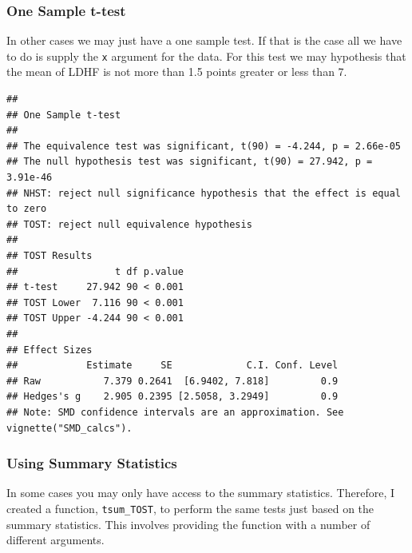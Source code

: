 \documentclass[]{interact}
\theoremstyle{plain}%
\theoremstyle{definition}
\theoremstyle{remark}
\newenvironment{Shaded}{\begin{snugshade}}{\end{snugshade}}
\newcommand{\AttributeTok}[1]{\textcolor[rgb]{0.77,0.63,0.00}{#1}}
\newcommand{\FloatTok}[1]{\textcolor[rgb]{0.00,0.00,0.81}{#1}}
\newcommand{\FunctionTok}[1]{\textcolor[rgb]{0.00,0.00,0.00}{#1}}
\newcommand{\NormalTok}[1]{#1}
\newcommand{\OtherTok}[1]{\textcolor[rgb]{0.56,0.35,0.01}{#1}}
\newcommand{\SpecialCharTok}[1]{\textcolor[rgb]{0.00,0.00,0.00}{#1}}
\newcommand{\StringTok}[1]{\textcolor[rgb]{0.31,0.60,0.02}{#1}}
\begin{document}
\newpage

\hypertarget{one-sample-t-test}{%
\subsubsection{One Sample t-test}\label{one-sample-t-test}}

In other cases we may just have a one sample test. If that is the case
all we have to do is supply the \texttt{x} argument for the data. For
this test we may hypothesis that the mean of LDHF is not more than 1.5
points greater or less than 7.

\begin{Shaded}
\end{Shaded}

\begin{verbatim}
## 
## One Sample t-test
## 
## The equivalence test was significant, t(90) = -4.244, p = 2.66e-05
## The null hypothesis test was significant, t(90) = 27.942, p = 3.91e-46
## NHST: reject null significance hypothesis that the effect is equal to zero 
## TOST: reject null equivalence hypothesis
## 
## TOST Results 
##                 t df p.value
## t-test     27.942 90 < 0.001
## TOST Lower  7.116 90 < 0.001
## TOST Upper -4.244 90 < 0.001
## 
## Effect Sizes 
##            Estimate     SE             C.I. Conf. Level
## Raw           7.379 0.2641  [6.9402, 7.818]         0.9
## Hedges's g    2.905 0.2395 [2.5058, 3.2949]         0.9
## Note: SMD confidence intervals are an approximation. See vignette("SMD_calcs").
\end{verbatim}

\newpage

\hypertarget{using-summary-statistics}{%
\subsubsection{Using Summary
Statistics}\label{using-summary-statistics}}

In some cases you may only have access to the summary statistics.
Therefore, I created a function, \texttt{tsum\_TOST}, to perform the
same tests just based on the summary statistics. This involves providing
the function with a number of different arguments.
\end{document}
